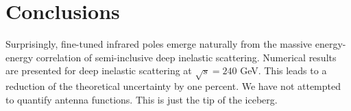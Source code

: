 \section{Conclusions}\label{sec:conclusions}

Surprisingly, fine-tuned infrared poles emerge naturally from the
massive energy-energy correlation of semi-inclusive deep inelastic
scattering. Numerical results are presented for deep inelastic
scattering at $\sqrt{s} = 240$ GeV. This leads to a reduction of the
theoretical uncertainty by one percent. We have not attempted to
quantify antenna functions. This is just the tip of the iceberg.

